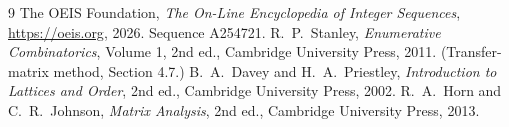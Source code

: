 \documentclass[11pt,a4paper]{article}
\theoremstyle{plain}
\theoremstyle{definition}
\begin{document}
\begin{thebibliography}{9}
 The OEIS Foundation, \emph{The On-Line Encyclopedia of Integer
Sequences}, \url{https://oeis.org}, 2026. Sequence A254721.
 R.~P.~Stanley, \emph{Enumerative Combinatorics}, Volume 1, 2nd ed.,
Cambridge University Press, 2011. (Transfer-matrix method, Section 4.7.)
 B.~A.~Davey and H.~A.~Priestley, \emph{Introduction to Lattices and
Order}, 2nd ed., Cambridge University Press, 2002.
 R.~A.~Horn and C.~R.~Johnson, \emph{Matrix Analysis}, 2nd ed., Cambridge
University Press, 2013.
\end{thebibliography}
\end{document}
